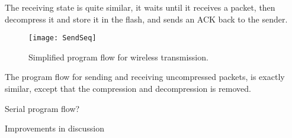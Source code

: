 The receiving state is quite similar, it waits until it receives a packet, then decompress it and store it in the flash, and sends an ACK back to the sender.


\begin{figure}[H]
\centering
\texttt{[image: SendSeq]}
\caption{Simplified program flow for wireless transmission.}
\label{fig:SendReceiveSeq}
\end{figure}

The program flow for sending and receiving uncompressed packets, is exactly similar, except that the compression and decompression is removed.

Serial program flow?

Improvements in discussion